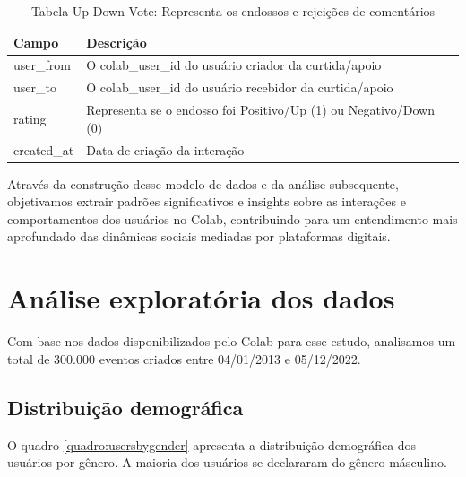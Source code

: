 \begin{table}[ht]
	\centering
	\caption{Tabela Up-Down Vote: Representa os endossos e rejeições de comentários}
	\label{tab:updown_model}
	\begin{tabularx}{\textwidth}{|l|X|}
		\hline
		\textbf{Campo} & \textbf{Descrição}                                               \\
		\hline
		user\_from     & O colab\_user\_id do usuário criador da curtida/apoio            \\
		user\_to       & O colab\_user\_id do usuário recebidor da curtida/apoio          \\
		rating         & Representa se o endosso foi Positivo/Up (1) ou Negativo/Down (0) \\
		created\_at    & Data de criação da interação                                     \\
		\hline
	\end{tabularx}
\end{table}

Através da construção desse modelo de dados e da análise subsequente, objetivamos extrair padrões significativos e insights sobre as interações e comportamentos dos usuários no Colab, contribuindo para um entendimento mais aprofundado das dinâmicas sociais mediadas por plataformas digitais.

\section{Análise exploratória dos dados}
\label{sec:colab_data_analysis}

Com base nos dados disponibilizados pelo Colab para esse estudo, analisamos um total de 300.000 eventos criados entre 04/01/2013 e 05/12/2022.

\subsection*{Distribuição demográfica}

O quadro \autoref{quadro:usersbygender} apresenta a distribuição demográfica dos usuários por gênero. A maioria dos usuários se declararam do gênero másculino.

